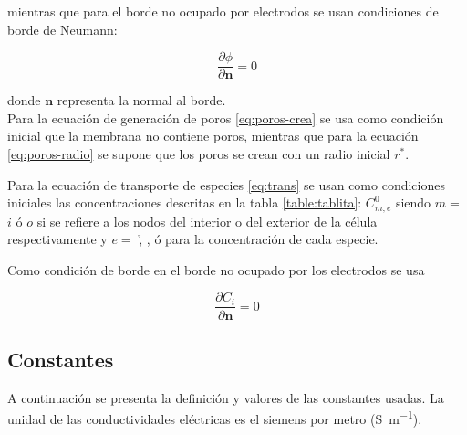 mientras que para el borde no ocupado por electrodos se usan condiciones de borde de Neumann:

\begin{equation}
	\frac{\partial \phi}{\partial \mathbf{n}} = 0
\end{equation}

donde $\mathbf{n}$ representa la normal al borde.\\

Para la ecuación de generación de poros \ref{eq:poros-crea} se usa como condición inicial que la membrana no contiene poros, mientras que para la ecuación \ref{eq:poros-radio} se supone que los poros se crean con un radio inicial $r^*$.

Para la ecuación de transporte de especies \ref{eq:trans} se usan como condiciones iniciales las concentraciones descritas en la tabla \ref{table:tablita}: $C_{m, e}^0$ siendo $m =$ $i$ ó $o$ si se refiere a los nodos del interior o del exterior de la célula respectivamente y $e =$ \h, \oh, \na{} ó \cl{} para la concentración de cada especie. %

Como condición de borde en el borde no ocupado por los electrodos se usa

\begin{equation}
	\frac{\partial C_i}{\partial \mathbf{n}} = 0
\end{equation}


\clearpage
\subsection*{Constantes}
A continuación se presenta la definición y valores de las constantes usadas. La unidad de las conductividades eléctricas es el siemens por metro (\si{\siemens\per\metre}).

\newcommand{\lineaTabla}[3]{ ${#1}$ & {#3} & {#2} \\ }

\newcommand{\anodo}[3] {
	\lineaTabla{C_{a,{#1}}}{\num{#2} \si{#3}}{Concentración de #1 en el ánodo}
}

\newcommand{\catodo}[3] {
	\lineaTabla{C_{c,{#1}}}{\num{#2} \si{#3}}{Concentración de #1 en el cátodo}
}

